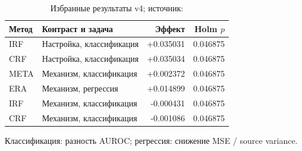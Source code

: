 \begin{table}[htbp]
\caption{Избранные результаты v4; источник: \cite{v4tests}}
\label{tab:v4}
\centering
\small
\begin{tabularx}{\textwidth}{@{}lXrr@{}}
\toprule
Метод & Контраст и задача & Эффект & Holm $p$ \\
\midrule
IRF & Настройка, классификация & +0.035031 & 0.046875 \\
CRF & Настройка, классификация & +0.035034 & 0.046875 \\
META & Механизм, классификация & +0.002372 & 0.046875 \\
ERA & Механизм, регрессия & +0.014899 & 0.046875 \\
IRF & Механизм, классификация & -0.000431 & 0.046875 \\
CRF & Механизм, классификация & -0.001086 & 0.046875 \\
\bottomrule
\end{tabularx}
\par\smallskip\footnotesize Классификация: разность AUROC; регрессия: снижение MSE / source variance.
\end{table}
